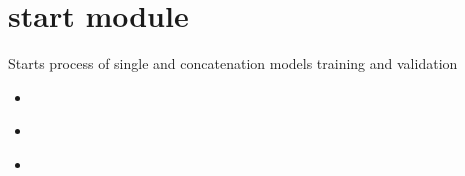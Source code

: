 \documentclass[letterpaper,10pt,english]{sphinxmanual}
\begin{document}
\sphinxstepscope


\section{start module}
\label{\detokenize{start:module-start}}\label{\detokenize{start:start-module}}\label{\detokenize{start::doc}}

\begin{fulllineitems}
\label{\detokenize{start:start.main}}
\pysigstartsignatures
{}
\pysigstopsignatures
\sphinxAtStartPar
Starts process of single and concatenation models training and validation

\end{fulllineitems}

\begin{itemize}
\item {} \begin{quote}\begin{description}
\sphinxAtStartPar
{}

\end{description}\end{quote}

\item {} \begin{quote}\begin{description}
\sphinxAtStartPar
{}

\end{description}\end{quote}

\item {} \begin{quote}\begin{description}
\sphinxAtStartPar
{}

\end{description}\end{quote}

\end{itemize}


\renewcommand{\indexname}{Python Module Index}
\begin{sphinxtheindex}
\let\bigletter\sphinxstyleindexlettergroup
\bigletter{s}
\item\relax{}
\item\relax{}
\end{sphinxtheindex}

\renewcommand{\indexname}{Index}
\printindex
\end{document}
